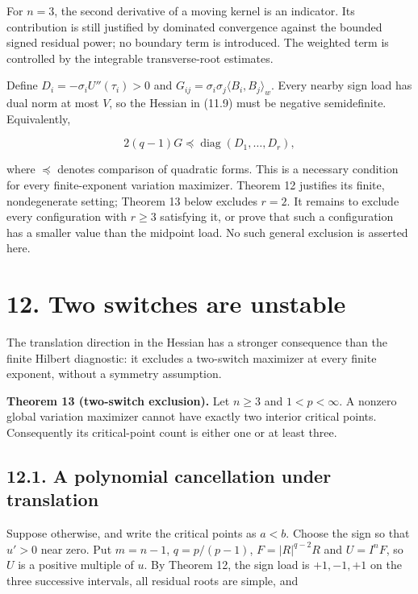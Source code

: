 \documentclass[11pt]{article}
\begin{document}
For \(n=3\), the second derivative of a moving kernel is an indicator.
Its contribution is still justified by dominated convergence against the
bounded signed residual power; no boundary term is introduced. The
weighted term is controlled by the integrable transverse-root estimates.

Define \(D_i=-\sigma_iU''(\tau_i)>0\) and
\(G_{ij}=\sigma_i\sigma_j\langle B_i,B_j\rangle_w\). Every nearby sign
load has dual norm at most \(V\), so the Hessian in (11.9) must be
negative semidefinite. Equivalently,

\[
2(q-1)G\preceq\operatorname{diag}(D_1,\ldots,D_r),
\tag{11.10}
\]

where \(\preceq\) denotes comparison of quadratic forms. This is a
necessary condition for every finite-exponent variation maximizer.
Theorem 12 justifies its finite, nondegenerate setting; Theorem 13 below
excludes \(r=2\). It remains to exclude every configuration with
\(r\ge3\) satisfying it, or prove that such a configuration has a
smaller value than the midpoint load. No such general exclusion is
asserted here.

\section{12. Two switches are unstable}\label{two-switches-are-unstable}

The translation direction in the Hessian has a stronger consequence than
the finite Hilbert diagnostic: it excludes a two-switch maximizer at
every finite exponent, without a symmetry assumption.

\textbf{Theorem 13 (two-switch exclusion).} Let \(n\ge3\) and
\(1<p<\infty\). A nonzero global variation maximizer cannot have exactly
two interior critical points. Consequently its critical-point count is
either one or at least three.

\subsection{12.1. A polynomial cancellation under
translation}\label{a-polynomial-cancellation-under-translation}

Suppose otherwise, and write the critical points as \(a<b\). Choose the
sign so that \(u'>0\) near zero. Put \(m=n-1\), \(q=p/(p-1)\),
\(F=|R|^{q-2}R\) and \(U=I^nF\), so \(U\) is a positive multiple of
\(u\). By Theorem 12, the sign load is \(+1,-1,+1\) on the three
successive intervals, all residual roots are simple, and
\end{document}
